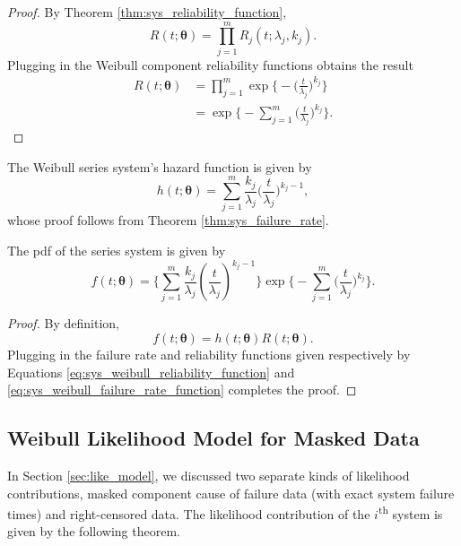 \documentclass[
]{article}
\begin{document}
\begin{proof}
By Theorem \ref{thm:sys_reliability_function},
$$
R(t;\boldsymbol{\theta}) = \prod_{j=1}^{m} R_j(t;\lambda_j,k_j).
$$
Plugging in the Weibull component reliability functions obtains the result
\begin{align*}
R(t;\boldsymbol{\theta})
    &= \prod_{j=1}^{m} \exp\biggl\{-\biggl(\frac{t}{\lambda_j}\biggr)^{k_j}\biggr\}\\
    &= \exp\biggl\{-\sum_{j=1}^{m}\biggl(\frac{t}{\lambda_j}\biggr)^{k_j}\biggr\}.
\end{align*}
\end{proof}

The Weibull series system's hazard function is given by \begin{equation}
\label{eq:sys_weibull_failure_rate_function}
h(t;\boldsymbol{\theta}) =
    \sum_{j=1}^{m} \frac{k_j}{\lambda_j}\biggl(\frac{t}{\lambda_j}\biggr)^{k_j-1},
\end{equation} whose proof follows from Theorem
\ref{thm:sys_failure_rate}.

The pdf of the series system is given by \begin{equation}
\label{eq:sys_weibull_pdf}
f(t;\boldsymbol{\theta}) =
\biggl\{
    \sum_{j=1}^m \frac{k_j}{\lambda_j}\left(\frac{t}{\lambda_j}\right)^{k_j-1}
\biggr\}
\exp
\biggl\{
    -\sum_{j=1}^m \bigl(\frac{t}{\lambda_j}\bigr)^{k_j}
\biggr\}.
\end{equation}

\begin{proof}
By definition,
$$
f(t;\boldsymbol{\theta}) = h(t;\boldsymbol{\theta}) R(t;\boldsymbol{\theta}).
$$
Plugging in the failure rate and reliability functions given respectively by
Equations \eqref{eq:sys_weibull_reliability_function} and
\eqref{eq:sys_weibull_failure_rate_function} completes the proof.
\end{proof}

\hypertarget{weibull-likelihood-model-for-masked-data}{%
\subsection{Weibull Likelihood Model for Masked
Data}\label{weibull-likelihood-model-for-masked-data}}

In Section \ref{sec:like_model}, we discussed two separate kinds of
likelihood contributions, masked component cause of failure data (with
exact system failure times) and right-censored data. The likelihood
contribution of the \(i\)\textsuperscript{th} system is given by the
following theorem.
\end{document}
